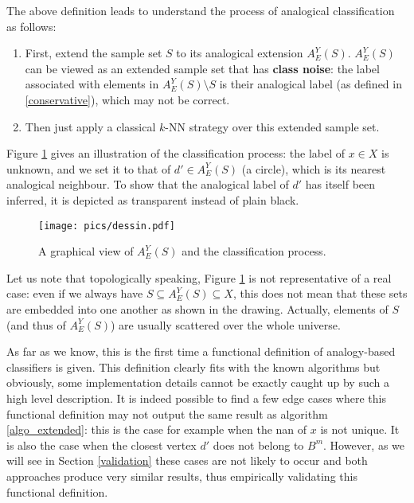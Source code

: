 \documentclass{ecai}
\begin{document}
The above definition leads to understand the process of analogical classification as follows:
\begin{enumerate}
  \item First, extend the sample set $S$ to its analogical extension
    $A_E^Y(S)$. $A_E^Y(S)$ can be viewed as an extended sample set that has
    \textbf{class noise}: the label associated with elements in $A_E^Y(S)
    \setminus S$ is their analogical label (as defined in \ref{conservative}),
    which may not be correct.
  \item Then just apply a classical $k$-NN strategy over this extended sample
    set.
\end{enumerate}

Figure \ref{extension} gives an illustration of the classification process: the
label of $x \in X$ is unknown, and we set it to that of $d' \in A_E^Y(S)$ (a
circle), which is its nearest analogical neighbour. To show that the analogical
label of $d'$ has itself been inferred, it is depicted as transparent instead of
plain black.
\begin{figure}
\caption{A graphical view of $A_E^Y(S)$ and the classification process.}
\label{extension}
\begin{center}
\texttt{[image: pics/dessin.pdf]}
\end{center}
\end{figure}
Let us note that topologically speaking, Figure \ref{extension} is not
representative of a real case: even if we always have $S \subseteq A_E^Y(S) \subseteq X$,
this does not mean that these sets are embedded into one another as shown in
the drawing. Actually, elements of $S$ (and thus of $A_E^Y(S)$) are usually
scattered over the whole universe.

As far as we know, this is the first time a functional definition of
analogy-based classifiers is given. This definition clearly fits with the known
algorithms but obviously, some implementation details cannot be exactly caught
up by such a high level description. It is indeed possible to find a few edge
cases where this functional definition may not output the same result as
algorithm \ref{algo_extended}: this is the case for example when the nan of $x$
is not unique. It is
also the case when the closest vertex $d'$ does not belong to $B^m$.  However,
as we will see in Section \ref{validation} these cases are not likely to occur
and both approaches produce very similar results, thus empirically validating
this functional definition.
\end{document}
